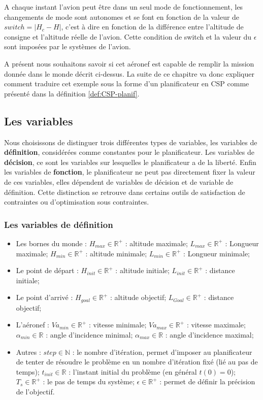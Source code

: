 A chaque instant l'avion peut être dans un seul mode de fonctionnement, les changements de mode sont autonomes et se font en fonction de la valeur de $switch = |H_c - H|$, c'est à dire en fonction de la différence entre l'altitude de consigne et l'altitude réelle de l'avion.
Cette condition de switch et la valeur du $\epsilon$ sont imposées par le systèmes de l'avion.

A présent nous souhaitons savoir si cet aéronef est capable de remplir la mission donnée dans le monde décrit ci-dessus. La suite de ce chapitre va donc expliquer comment traduire cet exemple sous la forme d'un planificateur en CSP comme présenté dans la définition \ref{def:CSP-planif}.

\subsection{Les variables}
\label{subSec:variables}
Nous choisissons de distinguer trois différentes types de variables, les variables de \textbf{définition}, considérées comme constantes pour le planificateur. Les variables de \textbf{décision}, ce sont les variables sur lesquelles le planificateur a de la liberté. Enfin les variables de \textbf{fonction}, le planificateur ne peut pas directement fixer la valeur de ces variables, elles dépendent de variables de décision et de variable de définition. Cette distinction se retrouve dans certains outils de satisfaction de contraintes ou d'optimisation sous contraintes.
\pagebreak
\subsubsection{Les variables de définition}
\begin{itemize}		
	\item Les bornes du monde :
		\subitem $H_{max} \in \mathbb{R}^+$ : altitude maximale;
		\subitem $L_{max} \in \mathbb{R}^+$ : Longueur maximale; 
		\subitem $H_{min} \in \mathbb{R}^+$ : altitude minimale;
		\subitem $L_{min} \in \mathbb{R}^+$ : Longueur minimale; 
	\item Le point de départ :
		\subitem $H_{init} \in \mathbb{R}^+$ : altitude initiale;
		\subitem $L_{init} \in \mathbb{R}^+$ : distance initiale;
	\item Le point d'arrivé :
		\subitem $H_{goal} \in \mathbb{R}^+$ : altitude objectif;
		\subitem $L_{Goal} \in \mathbb{R}^+$ : distance objectif;
	\item L'aéronef :
		\subitem $Va_{min} \in \mathbb{R}^+$ : vitesse minimale;		\subitem $Va_{max} \in \mathbb{R}^+$ : vitesse maximale;
		\subitem $\alpha_{min} \in \mathbb{R}$ : angle d'incidence minimal;		\subitem $\alpha_{max} \in \mathbb{R}$ : angle d'incidence maximal;
	\item Autres :
	\subitem $step \in \mathbb{N}$ : le nombre d'itération, permet d'imposer au planificateur de tenter de résoudre le problème en un nombre d'itération fixé (lié au pas de temps);
	\subitem $t_{init} \in \mathbb{R}$ : l'instant initial du problème (en général $t(0) = 0$);
	\subitem $T_s \in \mathbb{R}^+$ : le pas de temps du système;
	\subitem $\epsilon \in \mathbb{R}^+$ : permet de définir la précision de l'objectif.
\end{itemize}	

